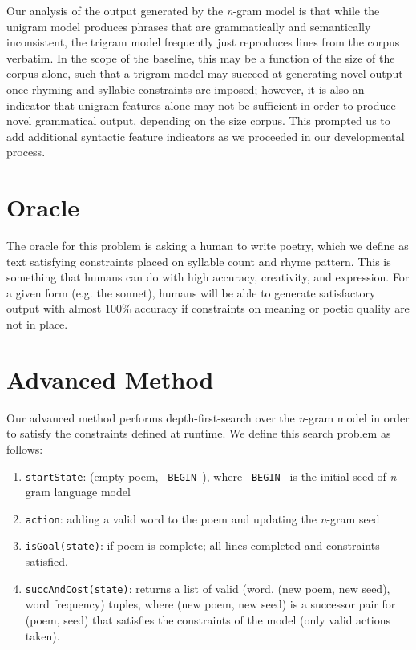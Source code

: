 \documentclass[10pt,twocolumn]{article}
\begin{document}
Our analysis of the output generated by the \emph{n}-gram model is that while the unigram model produces phrases that are grammatically and semantically inconsistent, the trigram model frequently just reproduces lines from the corpus verbatim. In the scope of the baseline, this may be a function of the size of the corpus alone, such that a trigram model may succeed at generating novel output once rhyming and syllabic constraints are imposed; however, it is also an indicator that unigram features alone may not be sufficient in order to produce novel grammatical output, depending on the size corpus. This prompted us to add additional syntactic feature indicators as we proceeded in our developmental process.

\section{Oracle}
The oracle for this problem is asking a human to write poetry, which we define as text satisfying constraints placed on syllable count and rhyme pattern. This is something that humans can do with high accuracy, creativity, and expression. For a given form (e.g. the sonnet), humans will be able to generate satisfactory output with almost 100\% accuracy if constraints on meaning or poetic quality are not in place. 

\section{Advanced Method}
Our advanced method performs depth-first-search over the \emph{n}-gram model in order to satisfy the constraints defined at runtime. We define this search problem as follows:
\begin{enumerate}
	\item \verb!startState!: (empty poem, \verb!-BEGIN-!), where \verb!-BEGIN-! is the initial seed of \emph{n}-gram language model
	\item \verb!action!: adding a valid word to the poem and updating the \emph{n}-gram seed
	\item \verb!isGoal(state)!: if poem is complete; all lines completed and constraints satisfied.
	\item \verb!succAndCost(state)!: returns a list of valid (word, (new poem, new seed), word frequency) tuples, where (new poem, new seed) is a successor pair for (poem, seed) that satisfies the constraints of the model (only valid actions taken). 
	\end{enumerate}
	
\end{document}
